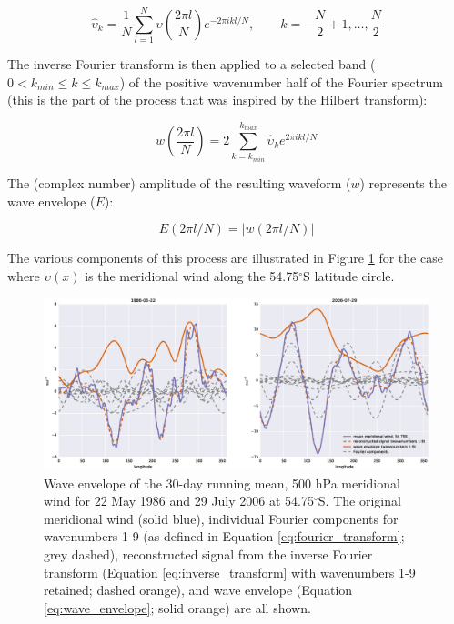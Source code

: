 \begin{equation}\label{eq:fourier_transform}
\hat{\upsilon}_k = \frac{1}{N}\sum_{l=1}^N \upsilon \left( \frac{2 \pi l}{N} \right) e^{-2 \pi ikl/N},\qquad k = -\frac{N}{2} + 1, \dotsc, \frac{N}{2}
\end{equation}

\noindent The inverse Fourier transform is then applied to a selected band ($0 < k_{min} \leq k \leq k_{max}$) of the positive wavenumber half of the Fourier spectrum (this is the part of the process that was inspired by the Hilbert transform):

\begin{equation}\label{eq:inverse_transform}
w \left( \frac{2 \pi l}{N} \right) = 2 \sum_{k=k_{min}}^{k_{max}} \hat{\upsilon}_k e^{2\pi ikl/N}
\end{equation}

\noindent The (complex number) amplitude of the resulting waveform ($w$) represents the wave envelope ($E$):

\begin{equation}\label{eq:wave_envelope}
E(2 \pi l / N) = | w(2 \pi l / N) |
\end{equation}

\noindent The various components of this process are illustrated in Figure \ref{fig:example_hilbert} for the case where $\upsilon(x)$ is the meridional wind along the 54.75$^{\circ}$S latitude circle. 

\begin{figure}
\begin{center}
\includegraphics[width=1\columnwidth]{figures/zonalwaves/hilbert_zw_w19_va_ERAInterim_500hPa_030day-runmean_native-55S_1986-05-22_2006-07-29.eps}
\caption[Wave envelope of the 30-day running mean, 500 hPa meridional wind for 22 May 1986 and 29 July 2006 at 54.75$^{\circ}$S]{\label{fig:example_hilbert}
Wave envelope of the 30-day running mean, 500 hPa meridional wind for 22 May 1986 and 29 July 2006 at 54.75$^{\circ}$S. The original meridional wind (solid blue), individual Fourier components for wavenumbers 1-9 (as defined in Equation \ref{eq:fourier_transform}; grey dashed), reconstructed signal from the inverse Fourier transform (Equation \ref{eq:inverse_transform} with wavenumbers 1-9 retained; dashed orange), and wave envelope (Equation \ref{eq:wave_envelope}; solid orange) are all shown. %
}
\end{center}
\end{figure}

